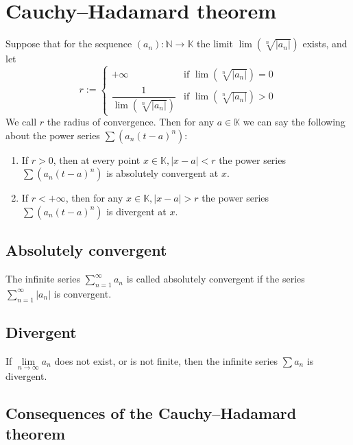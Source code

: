 \documentclass[margin=0px]{article}
\begin{document}
\section{Cauchy--Hadamard theorem}

Suppose that for the sequence $(a_{n}) : \mathbb{N} \to \mathbb{K}$ the limit $\lim{(\sqrt[n]{|a_{n}|})}$ exists, and let
$$ r := \left\{\begin{array} {lr}
        +\infty                              & \text{if } \lim{(\sqrt[n]{|a_{n}|})} = 0 \\
        \dfrac{1}{\lim{(\sqrt[n]{|a_{n}|})}} & \text{if } \lim{(\sqrt[n]{|a_{n}|})} > 0
    \end{array}\right.$$
We call $r$ the radius of convergence.
Then for any $a \in \mathbb{K}$ we can say the following about the power series $\sum{(a_{n}(t-a)^{n})}$:
\begin{enumerate}
    \item If $r > 0$, then at every point $x \in \mathbb{K}, |x-a| < r$ the power series $\sum{(a_{n}(t-a)^{n})}$ is absolutely convergent at $x$.
    \item If $r < +\infty$, then for any $x \in \mathbb{K}, |x-a| > r$ the power series $\sum{(a_{n}(t-a)^{n})}$ is divergent at $x$.
\end{enumerate}

\subsection{Absolutely convergent}

The infinite series $\sum\limits_{n=1}^{\infty}{a_{n}}$ is called absolutely convergent if the series $\sum\limits_{n=1}^{\infty}{|a_{n}|}$ is convergent.

\subsection{Divergent}

If $\lim\limits_{n \to \infty}{a_{n}}$ does not exist, or is not finite, then the infinite series $\sum{a_{n}}$ is divergent.

\subsection{Consequences of the Cauchy--Hadamard theorem}
\end{document}
